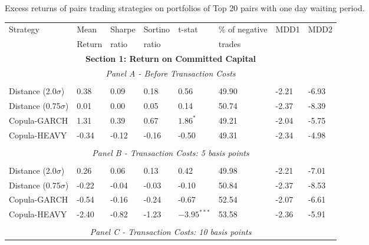 \documentclass[a4paper,12pt]{report}
\begin{document}
\begin{threeparttable}[H]
	\centering \scriptsize
	\caption{Excess returns of pairs trading strategies on portfolios of Top 20 pairs with one day waiting period.}
	\begin{tabularx}{\textwidth}{@{\extracolsep{\fill}}llllllll@{}}
		\toprule
		Strategy & Mean  & Sharpe & Sortino & t-stat & \% of negative   & MDD1 & MDD2 \\
		& Return & ratio &  ratio     &  &  trades     &       &  \\
		\midrule
		\multicolumn{8}{c}{\textbf{Section 1: Return on Committed Capital}} \\
		\multicolumn{8}{c}{\textit{Panel A - Before Transaction Costs}} \\
		&       &       &       &       &       &       &  \\
		Distance (2.0$\sigma$) & 0.38  & 0.09  & 0.18  & 0.56  & 49.90 & -2.21  & -6.93 \\
		Distance (0.75$\sigma$) & 0.01  & 0.00  & 0.05  & 0.14  & 50.74 & -2.37  & -8.39 \\
		Copula-GARCH & 1.31  & 0.39  & 0.67  & $1.86^{*}$  & 49.21 & -2.04  & -5.75 \\
		Copula-HEAVY & -0.34 & -0.12 & -0.16 & -0.50 & 49.31 & -2.34  & -4.98 \\
		\multicolumn{1}{r}{} & \multicolumn{1}{r}{} & \multicolumn{1}{r}{} & \multicolumn{1}{r}{} & \multicolumn{1}{r}{} & \multicolumn{1}{r}{} & \multicolumn{1}{r}{} & \multicolumn{1}{r}{} \\
		\multicolumn{8}{c}{\textit{Panel B - Transaction Costs: 5 basis points}} \\
		&       &       &       &       &       &       &  \\
		Distance (2.0$\sigma$) & 0.26  & 0.06  & 0.13  & 0.42  & 49.98 & -2.21  & -7.01 \\
		Distance (0.75$\sigma$) & -0.22 & -0.04 & -0.03 & -0.10 & 50.84 & -2.37  & -8.53 \\
		Copula-GARCH & -0.54 & -0.16 & -0.24 & -0.67 & 52.54 & -2.07  & -6.61 \\
		Copula-HEAVY & -2.40 & -0.82 & -1.23 & $-3.95^{***}$ & 53.58 & -2.36  & -5.91 \\
		\multicolumn{1}{r}{} & \multicolumn{1}{r}{} & \multicolumn{1}{r}{} & \multicolumn{1}{r}{} & \multicolumn{1}{r}{} & \multicolumn{1}{r}{} & \multicolumn{1}{r}{} & \multicolumn{1}{r}{} \\
		\multicolumn{8}{c}{\textit{Panel C - Transaction Costs: 10 basis points}} \\

\end{tabularx}
\end{threeparttable}
\end{document}
